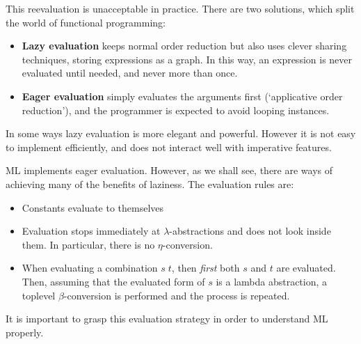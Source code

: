\begin{slide*}


\vspace*{0.5cm}

This reevaluation is unacceptable in practice. There are two solutions, which
split the world of functional programming:

\begin{itemize}

\item {\bf Lazy evaluation} keeps normal order reduction but also uses clever
sharing techniques, storing expressions as a graph. In this way, an expression
is never evaluated until needed, and never more than once.

\item {\bf Eager evaluation} simply evaluates the arguments first (`applicative
order reduction'), and the programmer is expected to avoid looping instances.

\end{itemize}

In some ways lazy evaluation is more elegant and powerful. However it is not
easy to implement efficiently, and does not interact well with imperative
features.

\end{slide*}


\begin{slide*}


\vspace*{0.5cm}

ML implements eager evaluation. However, as we shall see, there are ways of
achieving many of the benefits of laziness. The evaluation rules are:

\begin{itemize}

\item Constants evaluate to themselves

\item Evaluation stops immediately at $\lambda$-abstractions and does not look
inside them. In particular, there is no $\eta$-conversion.

\item When evaluating a combination {\red $s\; t$}, then {\em first} both {\red
$s$} and {\red $t$} are evaluated. Then, assuming that the evaluated form of
{\red $s$} is a lambda abstraction, a toplevel $\beta$-conversion is performed
and the process is repeated.

\end{itemize}

It is important to grasp this evaluation strategy in order to understand ML
properly.

\end{slide*}



